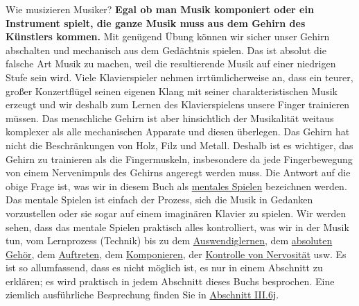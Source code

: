 Wie musizieren Musiker?
\textbf{Egal ob man Musik komponiert oder ein Instrument spielt, die ganze Musik muss aus dem Gehirn des Künstlers kommen.}
Mit genügend Übung können wir sicher unser Gehirn abschalten und mechanisch aus dem Gedächtnis spielen.
Das ist absolut die falsche Art Musik zu machen, weil die resultierende Musik auf einer niedrigen Stufe sein wird.
Viele Klavierspieler nehmen irrtümlicherweise an, dass ein teurer, großer Konzertflügel seinen eigenen Klang mit seiner charakteristischen Musik erzeugt und wir deshalb zum Lernen des Klavierspielens unsere Finger trainieren müssen.
Das menschliche Gehirn ist aber hinsichtlich der Musikalität weitaus komplexer als alle mechanischen Apparate und diesen überlegen.
Das Gehirn hat nicht die Beschränkungen von Holz, Filz und Metall.
Deshalb ist es wichtiger, das Gehirn zu trainieren als die Fingermuskeln, insbesondere da jede Fingerbewegung von einem Nervenimpuls des Gehirns angeregt werden muss.
Die Antwort auf die obige Frage ist, was wir in diesem Buch als \hyperlink{c1ii12mental}{mentales Spielen} bezeichnen werden.
Das mentale Spielen ist einfach der Prozess, sich die Musik in Gedanken vorzustellen oder sie sogar auf einem imaginären Klavier zu spielen.
Wir werden sehen, dass das mentale Spielen praktisch alles kontrolliert, was wir in der Musik tun, vom Lernprozess (Technik) bis zu dem \hyperlink{c1iii6}{Auswendiglernen}, dem \hyperlink{c1iii12}{absoluten Gehör}, dem \hyperlink{c1iii14}{Auftreten}, dem \hyperlink{c1iii12blatt}{Komponieren}, der \hyperlink{c1iii15}{Kontrolle von Nervosität} usw.
Es ist so allumfassend, dass es nicht möglich ist, es nur in einem Abschnitt zu erklären; es wird praktisch in jedem Abschnitt dieses Buchs besprochen.
Eine ziemlich ausführliche Besprechung finden Sie in \hyperlink{c1iii6tastatur}{Abschnitt III.6j}.

